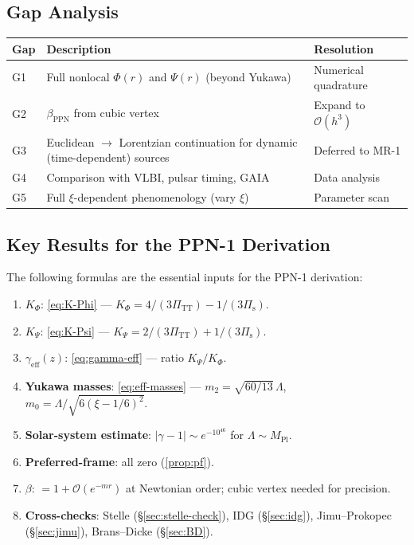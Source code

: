 \documentclass[11pt,a4paper]{article}
\theoremstyle{plain}
\theoremstyle{definition}
\theoremstyle{remark}
\begin{document}
\subsection{Gap Analysis}

\begin{center}
\begin{tabular}{lp{7cm}l}
\toprule
Gap & Description & Resolution \\
\midrule
G1 & Full nonlocal $\Phi(r)$ and $\Psi(r)$ (beyond Yukawa) &
  Numerical quadrature \\
G2 & $\beta_{\mathrm{PPN}}$ from cubic vertex &
  Expand to $\mathcal{O}(h^3)$ \\
G3 & Euclidean $\to$ Lorentzian continuation for dynamic
  (time-dependent) sources & Deferred to MR-1 \\
G4 & Comparison with VLBI, pulsar timing, GAIA &
  Data analysis \\
G5 & Full $\xi$-dependent phenomenology (vary $\xi$) &
  Parameter scan \\
\bottomrule
\end{tabular}
\end{center}

\subsection{Key Results for the PPN-1 Derivation}

The following formulas are the essential inputs for the PPN-1
derivation:

\begin{tcolorbox}[colback=green!5!white,colframe=green!40!black,
  title=\textbf{Key Inputs from Literature Review}]
\begin{enumerate}[nosep]
  \item \textbf{$K_\Phi$}: \cref{eq:K-Phi} ---
    $K_\Phi = 4/(3\Pi_{\mathrm{TT}}) - 1/(3\Pi_{\mathrm{s}})$.
  \item \textbf{$K_\Psi$}: \cref{eq:K-Psi} ---
    $K_\Psi = 2/(3\Pi_{\mathrm{TT}}) + 1/(3\Pi_{\mathrm{s}})$.
  \item \textbf{$\gamma_{\mathrm{eff}}(z)$}: \cref{eq:gamma-eff} ---
    ratio $K_\Psi/K_\Phi$.
  \item \textbf{Yukawa masses}: \cref{eq:eff-masses} ---
    $m_2 = \sqrt{60/13}\,\Lambda$, $m_0 = \Lambda/\sqrt{6(\xi-1/6)^2}$.
  \item \textbf{Solar-system estimate}: $|\gamma - 1|
    \sim e^{-10^{46}}$ for $\Lambda \sim M_{\mathrm{Pl}}$.
  \item \textbf{Preferred-frame}: all zero (\cref{prop:pf}).
  \item \textbf{$\beta$}: $= 1 + \mathcal{O}(e^{-mr})$ at Newtonian
    order; cubic vertex needed for precision.
  \item \textbf{Cross-checks}: Stelle (\S\ref{sec:stelle-check}),
    IDG (\S\ref{sec:idg}), Jimu--Prokopec (\S\ref{sec:jimu}),
    Brans--Dicke (\S\ref{sec:BD}).
\end{enumerate}
\end{tcolorbox}
\end{document}
